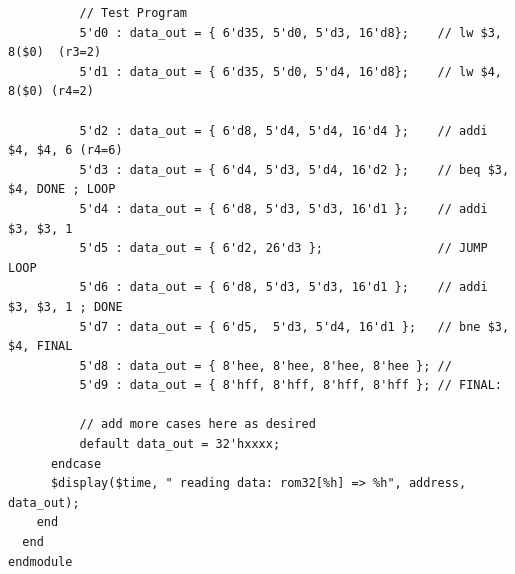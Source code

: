 \documentclass[12pt]{article}
\begin{document}
{\begin{verbatim}
          // Test Program
          5'd0 : data_out = { 6'd35, 5'd0, 5'd3, 16'd8};    // lw $3, 8($0)  (r3=2)
          5'd1 : data_out = { 6'd35, 5'd0, 5'd4, 16'd8};    // lw $4, 8($0) (r4=2)

          5'd2 : data_out = { 6'd8, 5'd4, 5'd4, 16'd4 };    // addi $4, $4, 6 (r4=6)
          5'd3 : data_out = { 6'd4, 5'd3, 5'd4, 16'd2 };    // beq $3, $4, DONE ; LOOP
          5'd4 : data_out = { 6'd8, 5'd3, 5'd3, 16'd1 };    // addi $3, $3, 1
          5'd5 : data_out = { 6'd2, 26'd3 };                // JUMP LOOP
          5'd6 : data_out = { 6'd8, 5'd3, 5'd3, 16'd1 };    // addi $3, $3, 1 ; DONE
          5'd7 : data_out = { 6'd5,  5'd3, 5'd4, 16'd1 };   // bne $3, $4, FINAL
          5'd8 : data_out = { 8'hee, 8'hee, 8'hee, 8'hee }; //
          5'd9 : data_out = { 8'hff, 8'hff, 8'hff, 8'hff }; // FINAL:

          // add more cases here as desired
          default data_out = 32'hxxxx;
      endcase
      $display($time, " reading data: rom32[%h] => %h", address, data_out);
    end
  end
endmodule
\end{verbatim}
}
\end{document}
